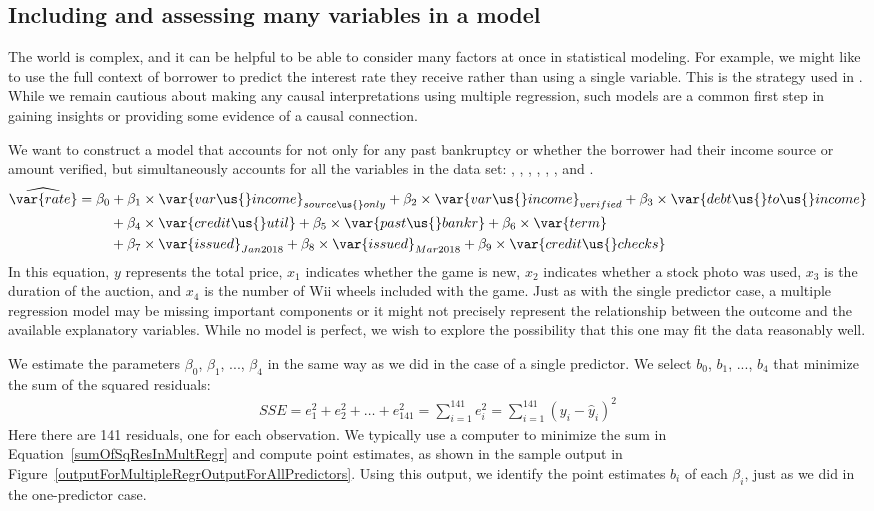 \subsection{Including and assessing many variables in a model}
\label{includingAndAssessingManyVariablesInAModel}

The world is complex, and it can be helpful to be able to
consider many factors at once in statistical modeling.
For example, we might like to use the full context of
borrower to predict the interest rate they receive
rather than using a single variable.
This is the strategy used in .
While we remain cautious about making any causal
interpretations using multiple regression,
such models are a common first step in gaining insights
or providing some evidence of a causal connection.

We want to construct a model that accounts for not only
for any past bankruptcy or whether the borrower had
their income source or amount verified,
but simultaneously accounts for all the variables
in the data set:
,
,
,
,
,
,
and .
\begin{align*}
\widehat{\var{rate}}
	&= \beta_0 +
	    \beta_1\times \var{var\us{}income}_{source\us{}only} +
	    \beta_2\times \var{var\us{}income}_{verified} +
		\beta_3\times \var{debt\us{}to\us{}income} \\
	&\qquad\  +
	    \beta_4 \times \var{credit\us{}util} +
	    \beta_5 \times \var{past\us{}bankr} +
		\beta_6 \times \var{term} \\
	&\qquad\  +
	    \beta_7 \times \var{issued}_{Jan2018} +
	    \beta_8 \times \var{issued}_{Mar2018} +
		\beta_9 \times \var{credit\us{}checks}
\end{align*}
In this equation, $y$ represents the total price, $x_1$ indicates whether the game is new, $x_2$ indicates whether a stock photo was used, $x_3$ is the duration of the auction, and $x_4$ is the number of Wii wheels included with the game. Just as with the single predictor case, a multiple regression model may be missing important components or it might not precisely represent the relationship between the outcome and the available explanatory variables. While no model is perfect, we wish to explore the possibility that this one may fit the data reasonably well.

We estimate the parameters $\beta_0$, $\beta_1$, ..., $\beta_4$ in the same way as we did in the case of a single predictor. We select $b_0$, $b_1$, ..., $b_4$ that minimize the sum of the squared residuals:
\begin{align}\label{sumOfSqResInMultRegr}
SSE = e_1^2 + e_2^2 + \dots + e_{141}^2
	= \sum_{i=1}^{141} e_i^2
	 = \sum_{i=1}^{141} \left(y_i - \hat{y}_i\right)^2
\end{align}
Here there are 141 residuals, one for each observation. We typically use a computer to minimize the sum in Equation~\eqref{sumOfSqResInMultRegr} and compute point estimates, as shown in the sample output in Figure~\ref{outputForMultipleRegrOutputForAllPredictors}. Using this output, we identify the point estimates $b_i$ of each $\beta_i$, just as we did in the one-predictor case.

